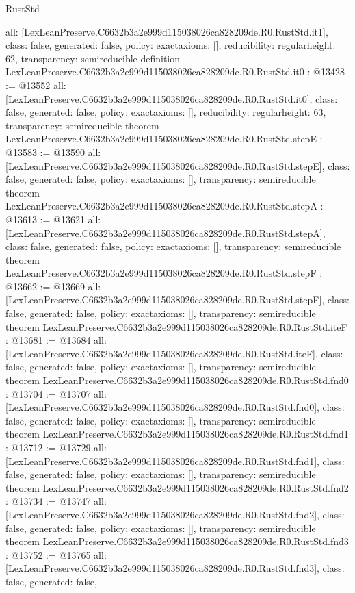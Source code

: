 \begin{lexlean}{RustStd}
\begin{coremodule}
{  all: [LexLeanPreserve.C6632b3a2e999d115038026ca828209de.R0.RustStd.it1],
  class: false,
  generated: false,
  policy: exact{axioms: []},
  reducibility: regular{height: 62},
  transparency: semireducible
}
definition LexLeanPreserve.C6632b3a2e999d115038026ca828209de.R0.RustStd.it0 : @13428 := @13552 {
  all: [LexLeanPreserve.C6632b3a2e999d115038026ca828209de.R0.RustStd.it0],
  class: false,
  generated: false,
  policy: exact{axioms: []},
  reducibility: regular{height: 63},
  transparency: semireducible
}
theorem LexLeanPreserve.C6632b3a2e999d115038026ca828209de.R0.RustStd.stepE : @13583 := @13590 {
  all: [LexLeanPreserve.C6632b3a2e999d115038026ca828209de.R0.RustStd.stepE],
  class: false,
  generated: false,
  policy: exact{axioms: []},
  transparency: semireducible
}
theorem LexLeanPreserve.C6632b3a2e999d115038026ca828209de.R0.RustStd.stepA : @13613 := @13621 {
  all: [LexLeanPreserve.C6632b3a2e999d115038026ca828209de.R0.RustStd.stepA],
  class: false,
  generated: false,
  policy: exact{axioms: []},
  transparency: semireducible
}
theorem LexLeanPreserve.C6632b3a2e999d115038026ca828209de.R0.RustStd.stepF : @13662 := @13669 {
  all: [LexLeanPreserve.C6632b3a2e999d115038026ca828209de.R0.RustStd.stepF],
  class: false,
  generated: false,
  policy: exact{axioms: []},
  transparency: semireducible
}
theorem LexLeanPreserve.C6632b3a2e999d115038026ca828209de.R0.RustStd.iteF : @13681 := @13684 {
  all: [LexLeanPreserve.C6632b3a2e999d115038026ca828209de.R0.RustStd.iteF],
  class: false,
  generated: false,
  policy: exact{axioms: []},
  transparency: semireducible
}
theorem LexLeanPreserve.C6632b3a2e999d115038026ca828209de.R0.RustStd.fnd0 : @13704 := @13707 {
  all: [LexLeanPreserve.C6632b3a2e999d115038026ca828209de.R0.RustStd.fnd0],
  class: false,
  generated: false,
  policy: exact{axioms: []},
  transparency: semireducible
}
theorem LexLeanPreserve.C6632b3a2e999d115038026ca828209de.R0.RustStd.fnd1 : @13712 := @13729 {
  all: [LexLeanPreserve.C6632b3a2e999d115038026ca828209de.R0.RustStd.fnd1],
  class: false,
  generated: false,
  policy: exact{axioms: []},
  transparency: semireducible
}
theorem LexLeanPreserve.C6632b3a2e999d115038026ca828209de.R0.RustStd.fnd2 : @13734 := @13747 {
  all: [LexLeanPreserve.C6632b3a2e999d115038026ca828209de.R0.RustStd.fnd2],
  class: false,
  generated: false,
  policy: exact{axioms: []},
  transparency: semireducible
}
theorem LexLeanPreserve.C6632b3a2e999d115038026ca828209de.R0.RustStd.fnd3 : @13752 := @13765 {
  all: [LexLeanPreserve.C6632b3a2e999d115038026ca828209de.R0.RustStd.fnd3],
  class: false,
  generated: false,
}
\end{coremodule}
\end{lexlean}
